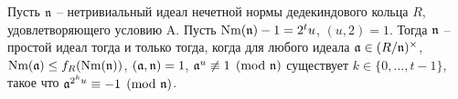 \documentclass[_00_dissertation.tex]{subfiles}
\begin{document}
\begin{theorem}\label{theorem:miller_criteria_deterministic}
    Пусть $\mathfrak{n}$ -- нетривиальный идеал нечетной нормы дедекиндового кольца $R$, удовлетворяющего условию A.
    Пусть $\textrm{Nm}(\mathfrak{n}) - 1 = 2^t u$, $(u, 2) = 1$.
    Тогда $\mathfrak{n}$ -- простой идеал тогда и только тогда, когда для любого идеала $\mathfrak{a} \in (R/\mathfrak{n})^{\times}$, $\textrm{Nm}(\mathfrak{a}) \le f_R(\textrm{Nm}(\mathfrak{n}))$, $(\mathfrak{a}, \mathfrak{n}) = 1$, $\mathfrak{a}^u \not\equiv 1 \pmod{\mathfrak{n}}$ существует $k\in \{0, \dots, t-1\}$, такое что $\mathfrak{a}^{2^{k}u} \equiv -1 \pmod{\mathfrak{n}}$.
\end{theorem}
%





\end{document}
